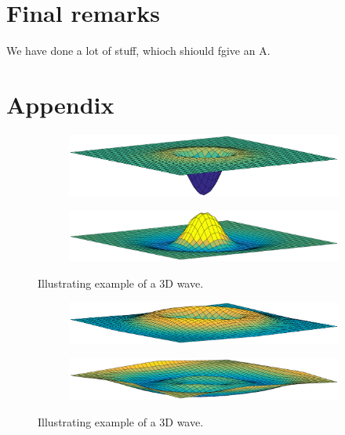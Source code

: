 \documentclass[12pt]{article}
\begin{document}
\section{Final remarks}
We have done a lot of stuff, whioch shiould fgive an A.

\clearpage
\section*{Appendix}

\begin{figure}[!h]
\centering
\begin{subfigure}[b]{\textwidth}
\includegraphics[width=\textwidth]{fig/3dv2_1.eps}
\label{fig1}
\end{subfigure}
\begin{subfigure}[b]{\textwidth}
\includegraphics[width=\textwidth]{fig/3dv2_2.eps}
\label{fig1}
\end{subfigure}
\caption{Illustrating example of a 3D wave.}
\end{figure}
\clearpage
\begin{figure}
\begin{subfigure}[b]{\textwidth}
\includegraphics[width=\textwidth]{fig/3dv2_3.eps}
\label{fig1}
\end{subfigure}
\begin{subfigure}[b]{\textwidth}
\includegraphics[width=\textwidth]{fig/3dv2_5.eps}
\label{fig1}
\end{subfigure}
\caption{Illustrating example of a 3D wave.}
\label{fig:3dWave}
\end{figure}
\end{document}
